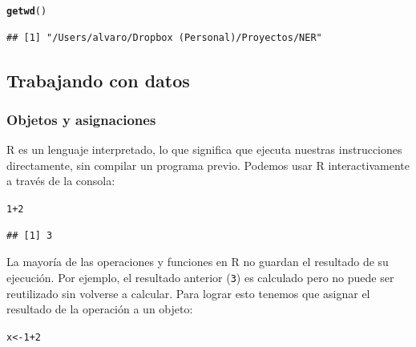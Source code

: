 \documentclass{report}\usepackage[]{graphicx}\usepackage[]{color}
\makeatletter
\newcommand{\hlnum}[1]{\textcolor[rgb]{0.686,0.059,0.569}{#1}}%
\newcommand{\hlopt}[1]{\textcolor[rgb]{0,0,0}{#1}}%
\newcommand{\hlstd}[1]{\textcolor[rgb]{0.345,0.345,0.345}{#1}}%
\newcommand{\hlkwb}[1]{\textcolor[rgb]{0.69,0.353,0.396}{#1}}%
\newcommand{\hlkwd}[1]{\textcolor[rgb]{0.737,0.353,0.396}{\textbf{#1}}}%
\newenvironment{kframe}{%
 \def\at@end@of@kframe{}%
 \ifinner\ifhmode%
  \def\at@end@of@kframe{\end{minipage}}%
  \begin{minipage}{\columnwidth}%
 \fi\fi%
 \def\FrameCommand##1{\hskip\@totalleftmargin \hskip-\fboxsep
 \colorbox{shadecolor}{##1}\hskip-\fboxsep
     \hskip-\linewidth \hskip-\@totalleftmargin \hskip\columnwidth}%
 \MakeFramed {\advance\hsize-\width
   \@totalleftmargin\z@ \linewidth\hsize
   \@setminipage}}%
 {\par\unskip\endMakeFramed%
 \at@end@of@kframe}
\newenvironment{knitrout}{}{} %
\makeatother
\begin{document}
\begin{knitrout}
\color{fgcolor}\begin{kframe}
\begin{alltt}
\hlkwd{getwd}\hlstd{()}
\end{alltt}
\begin{verbatim}
## [1] "/Users/alvaro/Dropbox (Personal)/Proyectos/NER"
\end{verbatim}
\end{kframe}
\end{knitrout}



\subsection{Trabajando con datos}

\subsubsection{Objetos y asignaciones}

R es un lenguaje interpretado, lo que significa que ejecuta nuestras instrucciones directamente, sin compilar un programa previo. Podemos usar R interactivamente a través de la consola:
\begin{knitrout}
\color{fgcolor}\begin{kframe}
\begin{alltt}
\hlnum{1}\hlopt{+}\hlnum{2}
\end{alltt}
\begin{verbatim}
## [1] 3
\end{verbatim}
\end{kframe}
\end{knitrout}

La mayoría de las operaciones y funciones en R no guardan el resultado de su ejecución. Por ejemplo, el resultado anterior (\verb|3|) es calculado pero no puede ser reutilizado sin volverse a calcular. Para lograr esto tenemos que asignar el resultado de la operación a un objeto:
\begin{knitrout}
\color{fgcolor}\begin{kframe}
\begin{alltt}
\hlstd{x} \hlkwb{<-} \hlnum{1}\hlopt{+}\hlnum{2}
\end{alltt}
\end{kframe}
\end{knitrout}
\end{document}
